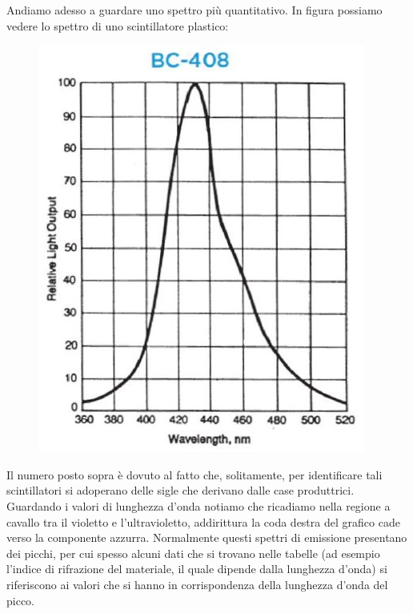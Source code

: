 \begin{esempio}
   Andiamo adesso a guardare uno spettro più quantitativo.
   In figura possiamo vedere lo spettro di uno scintillatore plastico:

   \begin{minipage}{0.39\textwidth}
      \begin{figure}[H]
         \centering
         \includegraphics[width=\textwidth]{immagini/esempio_spettro_scintillatore organico.png}
      \end{figure}
   \end{minipage}
   \hfill
   \begin{minipage}{0.6\textwidth}
      \vspace{1cm}Il numero posto sopra è dovuto al fatto che, solitamente, per identificare tali scintillatori si adoperano delle sigle che derivano dalle case produttrici. 
      Guardando i valori di lunghezza d'onda notiamo che ricadiamo nella regione a cavallo tra il violetto e l'ultravioletto, addirittura la coda destra del grafico cade verso la componente azzurra. Normalmente questi spettri di emissione presentano dei picchi, per cui spesso alcuni dati che si trovano nelle tabelle (ad esempio l'indice di rifrazione del materiale, il quale dipende dalla lunghezza d'onda) si riferiscono ai valori che si hanno in corrispondenza della lunghezza d'onda del picco.
   \end{minipage}
\end{esempio}

